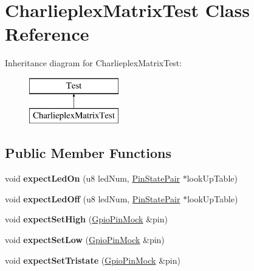 \hypertarget{class_charlieplex_matrix_test}{}\section{Charlieplex\+Matrix\+Test Class Reference}
\label{class_charlieplex_matrix_test}
Inheritance diagram for Charlieplex\+Matrix\+Test\+:\begin{figure}[H]
\begin{center}
\leavevmode
\includegraphics[height=2.000000cm]{class_charlieplex_matrix_test}
\end{center}
\end{figure}
\subsection*{Public Member Functions}
\begin{DoxyCompactItemize}
\item 
\mbox{\label{class_charlieplex_matrix_test_a490d8e867b769fa4c25f969d4f8c76bb}} 
void {\bfseries expect\+Led\+On} (u8 led\+Num, \mbox{\hyperlink{struct_pin_state_pair}{Pin\+State\+Pair}} $\ast$look\+Up\+Table)
\item 
\mbox{\label{class_charlieplex_matrix_test_a23bea605df737da5455a4ff1a481b2e2}} 
void {\bfseries expect\+Led\+Off} (u8 led\+Num, \mbox{\hyperlink{struct_pin_state_pair}{Pin\+State\+Pair}} $\ast$look\+Up\+Table)
\item 
\mbox{\label{class_charlieplex_matrix_test_a3f12e222c53d2e2ac6d2e97232bd1ebf}} 
void {\bfseries expect\+Set\+High} (\mbox{\hyperlink{class_gpio_pin_mock}{Gpio\+Pin\+Mock}} \&pin)
\item 
\mbox{\label{class_charlieplex_matrix_test_a4a8434ade5bf6a006a001b7dcd569000}} 
void {\bfseries expect\+Set\+Low} (\mbox{\hyperlink{class_gpio_pin_mock}{Gpio\+Pin\+Mock}} \&pin)
\item 
\mbox{\label{class_charlieplex_matrix_test_a466e5d543ce4c2141509f3272e041d48}} 
void {\bfseries expect\+Set\+Tristate} (\mbox{\hyperlink{class_gpio_pin_mock}{Gpio\+Pin\+Mock}} \&pin)
\end{DoxyCompactItemize}
